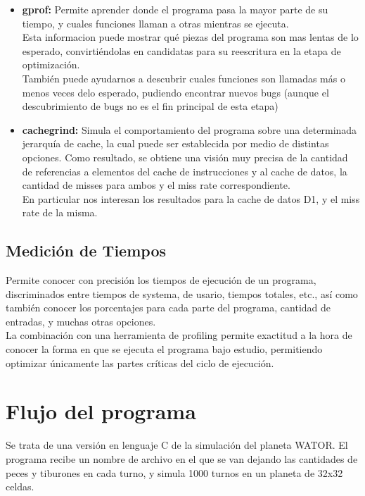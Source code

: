 \documentclass[a4paper,10pt]{article}
\begin{document}
 \begin{itemize}
	
\item {\textbf{gprof:} } {Permite aprender donde el programa pasa la mayor parte de su tiempo, y cuales funciones llaman a otras mientras se ejecuta.\\
 			   Esta informacion puede mostrar qu\'e piezas del programa son mas lentas de lo esperado, convirti\'endolas en candidatas para su reescritura en la etapa de optimizaci\'on.\\
 			   Tambi\'en puede ayudarnos a descubrir cuales funciones son llamadas m\'as o menos veces delo esperado, pudiendo encontrar nuevos bugs (aunque el descubrimiento de bugs no es el fin principal de esta etapa)
 			   }

\item{\textbf{cachegrind:}}{ Simula el comportamiento del programa sobre una determinada jerarqu\'ia de cache, la cual puede ser establecida por medio de distintas opciones. 
			Como resultado, se obtiene una visi\'on muy precisa de la cantidad de referencias a elementos del cache de instrucciones y al cache de datos, la cantidad de misses para ambos y el miss rate correspondiente.\\
			En particular nos interesan los resultados para la cache de datos D1, y el miss rate de la misma.}
			
\end{itemize}
			   
\subsection{Medici\'on de Tiempos}

Permite conocer con precisi\'on los tiempos de ejecuci\'on de un programa, discriminados entre tiempos de systema, de usario, tiempos totales, etc., as\'i como tambi\'en conocer los porcentajes para cada parte del programa, cantidad de entradas, y muchas otras opciones.\\
				     La combinaci\'on con una herramienta de profiling permite exactitud a la hora de conocer la forma en que se ejecuta el programa bajo estudio, permitiendo optimizar \'unicamente las partes cr\'iticas del ciclo de ejecuci\'on.

\newpage


\section{Flujo del programa}
Se trata de una versi\'on en lenguaje C de la simulaci\'on del planeta WATOR. El programa recibe un nombre de archivo en el que se van dejando
las cantidades de peces y tiburones en cada turno, y simula 1000 turnos en un planeta de 32x32 celdas.\\
\end{document}
